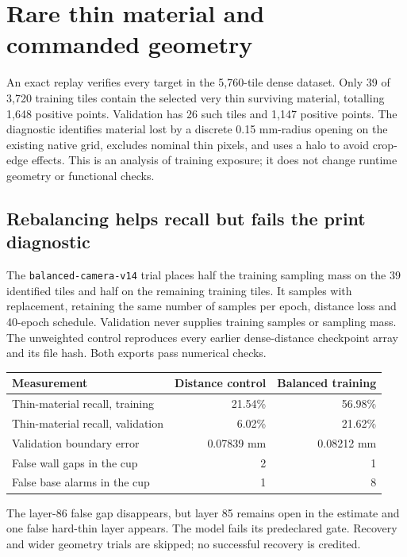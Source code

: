 \documentclass[10pt,letterpaper]{article}
\begin{document}
\clearpage
\section{Rare thin material and commanded geometry}

An exact replay verifies every target in the 5,760-tile dense dataset. Only 39 of
3,720 training tiles contain the selected very thin surviving material, totalling
1,648 positive points. Validation has 26 such tiles and 1,147 positive points.
The diagnostic identifies material lost by a discrete 0.15 mm-radius opening on
the existing native grid, excludes nominal thin pixels, and uses a halo to avoid
crop-edge effects. This is an analysis of training exposure; it does not change
runtime geometry or functional checks.

\subsection*{Rebalancing helps recall but fails the print diagnostic}
The \texttt{balanced-camera-v14} trial places half the training sampling mass on
the 39 identified tiles and half on the remaining training tiles. It samples with
replacement, retaining the same number of samples per epoch, distance loss and
40-epoch schedule. Validation never supplies training samples or sampling mass.
The unweighted control reproduces every earlier dense-distance checkpoint array
and its file hash. Both exports pass numerical checks.

\begin{center}
\begin{tabular}{@{}lrr@{}}
\toprule
Measurement & Distance control & Balanced training \\
\midrule
Thin-material recall, training & 21.54\% & 56.98\% \\
Thin-material recall, validation & 6.02\% & 21.62\% \\
Validation boundary error & 0.07839 mm & 0.08212 mm \\
False wall gaps in the cup & 2 & 1 \\
False base alarms in the cup & 1 & 8 \\
\bottomrule
\end{tabular}
\end{center}

The layer-86 false gap disappears, but layer 85 remains open in the estimate and
one false hard-thin layer appears. The model fails its predeclared gate. Recovery
and wider geometry trials are skipped; no successful recovery is credited.
\end{document}
